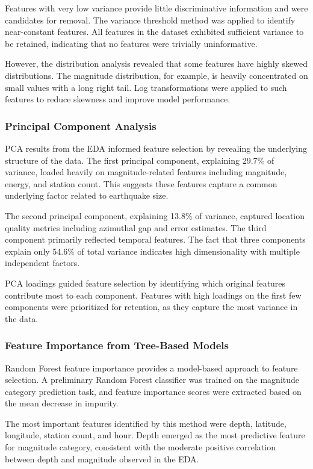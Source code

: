 Features with very low variance provide little discriminative information and were candidates for removal. The variance threshold method was applied to identify near-constant features. All features in the dataset exhibited sufficient variance to be retained, indicating that no features were trivially uninformative.

However, the distribution analysis revealed that some features have highly skewed distributions. The magnitude distribution, for example, is heavily concentrated on small values with a long right tail. Log transformations were applied to such features to reduce skewness and improve model performance.

\subsubsection{Principal Component Analysis}

PCA results from the EDA informed feature selection by revealing the underlying structure of the data. The first principal component, explaining 29.7\% of variance, loaded heavily on magnitude-related features including magnitude, energy, and station count. This suggests these features capture a common underlying factor related to earthquake size.

The second principal component, explaining 13.8\% of variance, captured location quality metrics including azimuthal gap and error estimates. The third component primarily reflected temporal features. The fact that three components explain only 54.6\% of total variance indicates high dimensionality with multiple independent factors.

PCA loadings guided feature selection by identifying which original features contribute most to each component. Features with high loadings on the first few components were prioritized for retention, as they capture the most variance in the data.

\subsubsection{Feature Importance from Tree-Based Models}

Random Forest feature importance provides a model-based approach to feature selection. A preliminary Random Forest classifier was trained on the magnitude category prediction task, and feature importance scores were extracted based on the mean decrease in impurity.

The most important features identified by this method were depth, latitude, longitude, station count, and hour. Depth emerged as the most predictive feature for magnitude category, consistent with the moderate positive correlation between depth and magnitude observed in the EDA.

